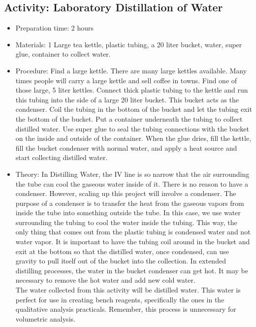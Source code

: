 \begin{itemize}
{\begin{itemize}
\begin{itemize}
{\subsection{Activity: Laboratory Distillation of Water}
\begin{itemize}
\item{Preparation time: 2 hours}
\item{Materials: 1 Large tea kettle, plastic tubing, a 20 liter bucket, water, super glue, container to collect water.}
\item{Procedure: Find a large kettle. There are many large kettles available. Many times people will carry a large kettle and sell coffee in towns. Find one of those large, 5 liter kettles. Connect thick plastic tubing to the kettle and run this tubing into the side of a large 20 liter bucket. This bucket acts as the condenser. Coil the tubing in the bottom of the bucket and let the tubing exit the bottom of the bucket. Put a container underneath the tubing to collect distilled water. Use super glue to seal the tubing connections with the bucket on the inside and outside of the container. When the glue dries, fill the kettle, fill the bucket condenser with normal water, and apply a heat source and start collecting distilled water.}
\item{Theory: In Distilling Water, the IV line is so narrow that the air surrounding the tube can cool the gaseous water inside of it. There is no reason to have a condenser. However, scaling up this project will involve a condenser. The purpose of a condenser is to transfer the heat from the gaseous vapors from inside the tube into something outside the tube. In this case, we use water surrounding the tubing to cool the water inside the tubing. This way, the only thing that comes out from the plastic tubing is condensed water and not water vapor. It is important to have the tubing coil around in the bucket and exit at the bottom so that the distilled water, once condensed, can use gravity to pull itself out of the bucket into the collection. In extended distilling processes, the water in the bucket condenser can get hot. It may be necessary to remove the hot water and add new cold water.\\
The water collected from this activity will be distilled water. This water is perfect for use in creating bench reagents, specifically the ones in the qualitative analysis practicals. Remember, this process is unnecessary for volumetric analysis.}
\end{itemize}

}
\end{itemize}
\end{itemize}}
\end{itemize}
